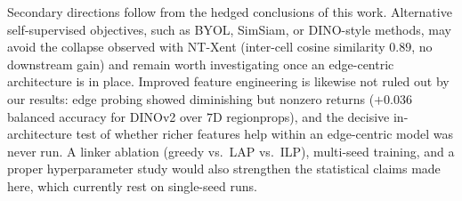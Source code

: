 Secondary directions follow from the hedged conclusions of this work. Alternative self-supervised objectives, such as BYOL, SimSiam, or DINO-style methods, may avoid the collapse observed with NT-Xent (inter-cell cosine similarity $0.89$, no downstream gain) and remain worth investigating once an edge-centric architecture is in place. Improved feature engineering is likewise not ruled out by our results: edge probing showed diminishing but nonzero returns ($+0.036$ balanced accuracy for DINOv2 over $7$D regionprops), and the decisive in-architecture test of whether richer features help within an edge-centric model was never run. A linker ablation (greedy vs.\ LAP vs.\ ILP), multi-seed training, and a proper hyperparameter study would also strengthen the statistical claims made here, which currently rest on single-seed runs.

\clearpage

